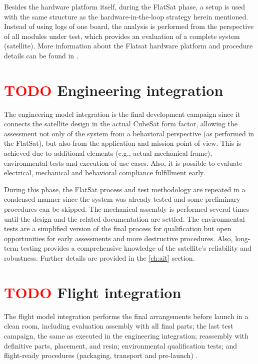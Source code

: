 Besides the hardware platform itself, during the FlatSat phase, a setup is used with the same structure as the hardware-in-the-loop strategy herein mentioned. Instead of using logs of one board, the analysis is performed from the perspective of all modules under test, which provides an evaluation of a complete system (satellite). More information about the Flatsat hardware platform and procedure details can be found in \cite{flatsat}.


\section{ \textcolor{red}{TODO} Engineering integration}

The engineering model integration is the final development campaign since it connects the satellite design in the actual CubeSat form factor, allowing the assessment not only of the system from a behavioral perspective (as performed in the FlatSat), but also from the application and mission point of view. This is achieved due to additional elements (e.g., actual mechanical frame), environmental tests and execution of use cases. Also, it is possible to evaluate electrical, mechanical and behavioral compliance fulfillment early.

During this phase, the FlatSat process and test methodology are repeated in a condensed manner since the system was already tested and some preliminary procedures can be skipped. The mechanical assembly is performed several times until the design and the related documentation are settled. The environmental tests are a simplified version of the final process for qualification but open opportunities for early assessments and more destructive procedures. Also, long-term testing provides a comprehensive knowledge of the satellite's reliability and robustness. Further details are provided in the \autoref{ch:ait} section.


\section{ \textcolor{red}{TODO} Flight integration}

The flight model integration performs the final arrangements before launch in a clean room, including evaluation assembly with all final parts; the last test campaign, the same as executed in the engineering integration; reassembly with definitive parts, placement, and resin; environmental qualification tests; and flight-ready procedures (packaging, transport and pre-launch) \cite{marcelino2021}.

